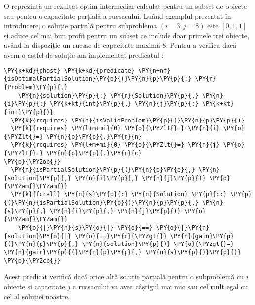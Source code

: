 \begin{sloppypar}
O  reprezintă un rezultat optim intermediar calculat pentru un subset de obiecte sau pentru o capacitate parțială a rucsacului. Luând exemplul prezentat în introducere, o soluție parțială pentru subproblema $(i = 3, j = 8)$ este $[0, 1, 1]$ și aduce cel mai bun profit pentru un subset ce include doar primele trei obiecte, având la dispoziție un rucsac de capacitate maximă 8. Pentru a verifica dacă avem o astfel de soluție am implementat predicatul :
    \begin{Verbatim}[commandchars=\\\{\}]
\PY{k+kd}{ghost} \PY{k+kd}{predicate} \PY{n+nf}{isOptimalPartialSolution}\PY{p}{(}\PY{n}{p}\PY{p}{:} \PY{n}{Problem}\PY{p}{,} 
    \PY{n}{solution}\PY{p}{:} \PY{n}{Solution}\PY{p}{,} \PY{n}{i}\PY{p}{:} \PY{k+kt}{int}\PY{p}{,} \PY{n}{j}\PY{p}{:} \PY{k+kt}{int}\PY{p}{)}
  \PY{k}{requires} \PY{n}{isValidProblem}\PY{p}{(}\PY{n}{p}\PY{p}{)}
  \PY{k}{requires} \PY{l+m+mi}{0} \PY{o}{\PYZlt{}=} \PY{n}{i} \PY{o}{\PYZlt{}=} \PY{n}{p}\PY{p}{.}\PY{n}{n}
  \PY{k}{requires} \PY{l+m+mi}{0} \PY{o}{\PYZlt{}=} \PY{n}{j} \PY{o}{\PYZlt{}=} \PY{n}{p}\PY{p}{.}\PY{n}{c}
\PY{p}{\PYZob{}}
  \PY{n}{isPartialSolution}\PY{p}{(}\PY{n}{p}\PY{p}{,} \PY{n}{solution}\PY{p}{,} \PY{n}{i}\PY{p}{,} \PY{n}{j}\PY{p}{)} \PY{o}{\PYZam{}\PYZam{}}
  \PY{k}{forall} \PY{n}{s}\PY{p}{:} \PY{n}{Solution} \PY{p}{::} \PY{p}{(}\PY{n}{isPartialSolution}\PY{p}{(}\PY{n}{p}\PY{p}{,} \PY{n}{s}\PY{p}{,} \PY{n}{i}\PY{p}{,} \PY{n}{j}\PY{p}{)} \PY{o}{\PYZam{}\PYZam{}} 
    \PY{o}{|}\PY{n}{s}\PY{o}{|} \PY{o}{==} \PY{o}{|}\PY{n}{solution}\PY{o}{|} \PY{o}{==}\PY{o}{\PYZgt{}} \PY{n}{gain}\PY{p}{(}\PY{n}{p}\PY{p}{,} \PY{n}{solution}\PY{p}{)} \PY{o}{\PYZgt{}=} \PY{n}{gain}\PY{p}{(}\PY{n}{p}\PY{p}{,} \PY{n}{s}\PY{p}{)}\PY{p}{)}
\PY{p}{\PYZcb{}}
\end{Verbatim}
\par Acest predicat verifică dacă orice altă soluție parțială pentru o subproblemă cu $i$ obiecte și capacitate $j$ a rucsacului va avea câștigul mai mic sau cel mult egal cu cel al soluției noastre. 


\end{sloppypar}
